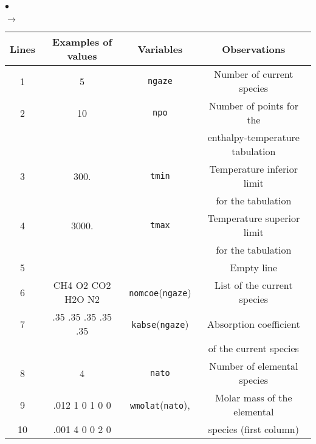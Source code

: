 {{{\begin{list}{$\bullet$}{}
\begin{list}{$\rightarrow$}{}
\begin{table}[htbp]
\begin{center}
\small{
\begin{tabular}{|c|c|c|c|} \hline
 Lines  &Examples of values &        Variables             & Observations                                     \\ \hline
  1     &         5         &  \texttt{ngaze\index{ngaze}} & Number of current species                        \\ \hline
  2     &        10         &   \texttt{npo\index{npo}}    & Number of points for the                         \\
        &                   &                              & enthalpy-temperature tabulation                  \\ \hline
  3     &       300.        &  \texttt{tmin\index{tmin}}   & Temperature inferior limit                       \\
        &                   &                              & for the tabulation                               \\ \hline
  4     &      3000.        &  \texttt{tmax\index{tmax}}   & Temperature superior limit                       \\
        &                   &                              & for the tabulation                               \\ \hline
  5     &                   &                              & Empty line                                       \\ \hline
  6     & CH4 O2 CO2 H2O N2 &  \texttt{nomcoe\index{nomcoe}}(\texttt{ngaze}) & List of the current species                      \\ \hline
  7     &.35 .35 .35 .35 .35&  \texttt{kabse\index{kabse}}(\texttt{ngaze})   & Absorption coefficient                           \\
        &                   &                              & of  the current species                          \\ \hline
  8     &         4         &  \texttt{nato\index{nato}}   & Number of elemental species                      \\ \hline
  9     &.012  1  0  1  0  0& \texttt{wmolat\index{wmolat}}(\texttt{nato}),  & Molar mass of the elemental                      \\
 10     &.001  4  0  0  2  0&                              & species (first column)                           \\

\end{tabular}}
\end{center}
\end{table}
\end{list}
\end{list}}}}
